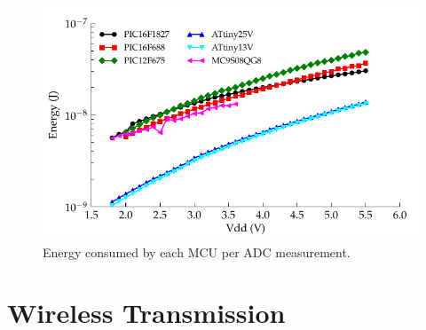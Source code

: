 \begin{figure}
\begin{centering}
\includegraphics{content/pt1/02-Microcontrollers/graphics/Graph_ALL_ADC_JPM}
\protect\caption{Energy consumed by each MCU per ADC measurement.\label{fig:Energy-consumed-ADC}}

\par\end{centering}

\end{figure}


\section{Wireless Transmission}
